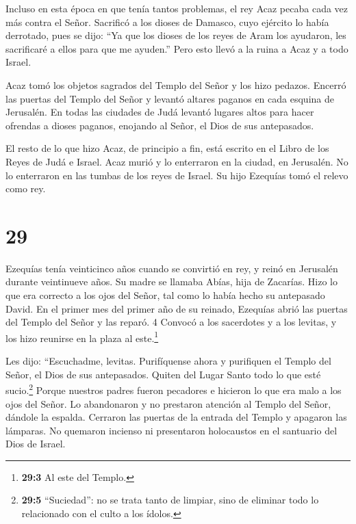  Incluso en esta época en que tenía tantos problemas, el
rey Acaz pecaba cada vez más contra el Señor.  Sacrificó a
los dioses de Damasco, cuyo ejército lo había derrotado, pues se dijo:
``Ya que los dioses de los reyes de Aram los ayudaron, les sacrificaré a
ellos para que me ayuden.'' Pero esto llevó a la ruina a Acaz y a todo
Israel.

 Acaz tomó los objetos sagrados del Templo del Señor y los
hizo pedazos. Encerró las puertas del Templo del Señor y levantó altares
paganos en cada esquina de Jerusalén.  En todas las
ciudades de Judá levantó lugares altos para hacer ofrendas a dioses
paganos, enojando al Señor, el Dios de sus antepasados.

 El resto de lo que hizo Acaz, de principio a fin, está
escrito en el Libro de los Reyes de Judá e Israel.  Acaz
murió y lo enterraron en la ciudad, en Jerusalén. No lo enterraron en
las tumbas de los reyes de Israel. Su hijo Ezequías tomó el relevo como
rey.

\hypertarget{section-28}{%
\section{29}\label{section-28}}

 Ezequías tenía veinticinco años cuando se convirtió en rey,
y reinó en Jerusalén durante veintinueve años. Su madre se llamaba
Abías, hija de Zacarías.  Hizo lo que era correcto a los
ojos del Señor, tal como lo había hecho su antepasado David.
 En el primer mes del primer año de su reinado, Ezequías
abrió las puertas del Templo del Señor y las reparó. 4 Convocó a los
sacerdotes y a los levitas, y los hizo reunirse en la plaza al
este.\footnote{\textbf{29:3} Al este del Templo.}

 Les dijo: ``Escuchadme, levitas. Purifíquense ahora y
purifiquen el Templo del Señor, el Dios de sus antepasados. Quiten del
Lugar Santo todo lo que esté sucio.\footnote{\textbf{29:5} ``Suciedad'':
  no se trata tanto de limpiar, sino de eliminar todo lo relacionado con
  el culto a los ídolos.}  Porque nuestros padres fueron
pecadores e hicieron lo que era malo a los ojos del Señor. Lo
abandonaron y no prestaron atención al Templo del Señor, dándole la
espalda.  Cerraron las puertas de la entrada del Templo y
apagaron las lámparas. No quemaron incienso ni presentaron holocaustos
en el santuario del Dios de Israel.

